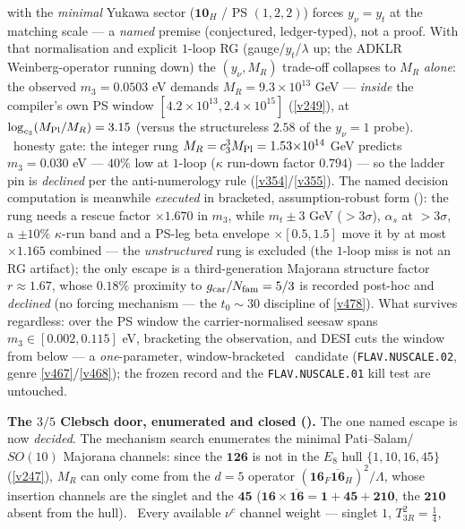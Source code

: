 with the \emph{minimal} Yukawa sector ($\mathbf{10}_H$ / PS $(1,2,2)$) forces $y_\nu=y_t$ at the matching scale
--- a \emph{named} premise (conjectured, ledger-typed), not a proof. With that normalisation and explicit $1$-loop RG
(gauge/$y_t$/$\lambda$ up; the ADKLR Weinberg-operator running down) the $(y_\nu,M_R)$ trade-off collapses to
$M_R$ \emph{alone}: the observed $m_3{=}0.0503$ eV demands $M_R=9.3{\times}10^{13}$ GeV --- \emph{inside} the
compiler's own PS window $[4.2{\times}10^{13},2.4{\times}10^{15}]$ (\vref{v249}), at
$\log_{c_3}(M_{\mathrm{Pl}}/M_R)=3.15$ (versus the structureless $2.58$ of the $y_\nu{=}1$ probe). \mX\ honesty gate: the
integer rung $M_R=c_3^3M_{\mathrm{Pl}}=1.53{\times}10^{14}$ GeV predicts $m_3=0.030$ eV --- $40\%$ low at $1$-loop
($\kappa$ run-down factor $0.794$) --- so the ladder pin is \emph{declined} per the anti-numerology rule
(\vref{v354}/\vref{v355}). The named decision computation is meanwhile \emph{executed} in bracketed,
assumption-robust form (): the rung needs a rescue factor
$\times1.670$ in $m_3$, while $m_t\pm3$ GeV ($>3\sigma$), $\alpha_s$ at $>3\sigma$, a $\pm10\%$
$\kappa$-run band and a PS-leg beta envelope $\times[0.5,1.5]$ move it by at most $\times1.165$
combined --- the \emph{unstructured} rung is excluded (the $1$-loop miss is not an RG artifact); the
only escape is a third-generation Majorana structure factor $r\approx1.67$, whose $0.18\%$ proximity to
$g_{\mathrm{car}}/N_{\mathrm{fam}}=5/3$ is recorded post-hoc and \emph{declined} (no forcing mechanism --- the $t_0{\sim}30$
discipline of \vref{v478}). What survives regardless: over the PS window the carrier-normalised seesaw spans
$m_3\in[0.002,0.115]$ eV, bracketing the observation, and DESI cuts the window from below --- a
\emph{one}-parameter, window-bracketed \mO\ candidate (\texttt{FLAV.NUSCALE.02}, genre
\vref{v467}/\vref{v468}); the frozen record and the \texttt{FLAV.NUSCALE.01} kill test are untouched.
\par\smallskip\noindent\textbf{The $3/5$ Clebsch door, enumerated and closed
().} The one named escape is now \emph{decided}. The mechanism search
enumerates the minimal Pati--Salam/$SO(10)$ Majorana channels: since the $\overline{\mathbf{126}}$ is not in the
$E_8$ hull $\{1,10,16,45\}$ (\vref{v247}), $M_R$ can only come from the $d{=}5$ operator
$(\mathbf{16}_F\overline{\mathbf{16}}_H)^2/\Lambda$, whose insertion channels are the singlet and the
$\mathbf{45}$ ($\mathbf{16}\times\overline{\mathbf{16}}=\mathbf{1}+\mathbf{45}+\mathbf{210}$, the $\mathbf{210}$
absent from the hull). \mE\ Every available $\nu^c$ channel weight --- singlet $1$, $T_{3R}^2=\tfrac14$,
